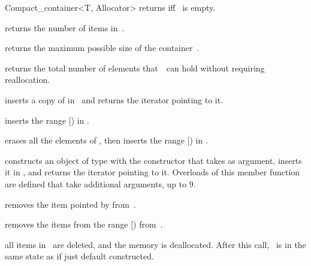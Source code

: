 \begin{ccRefClass}{Compact_container<T, Allocator>}
  {returns  iff \ccVar\ is empty.}

  \ccGlue{}
  {returns the number of items in~\ccVar.}

  \ccGlue{}
  {returns the maximum possible size of the container~\ccVar.}

  \ccGlue{}
  {returns the total number of elements that~\ccVar\ can hold without requiring
   reallocation.}




  {inserts a copy of  in \ccVar\ and returns the iterator pointing
   to it.}

  {inserts the range [) in \ccVar.}

  {erases all the elements of \ccVar, then inserts the range
   [) in \ccVar.}

  {constructs an object of type  with the constructor that takes
    as argument, inserts it in \ccVar, and returns the iterator pointing
   to it.  Overloads of this member function are defined that take additional
   arguments, up to 9.}


  {removes the item pointed by  from~\ccVar.}

  {removes the items from the range [) from~\ccVar.}

  {all items in \ccVar\ are deleted, and the memory is deallocated.
   After this call, \ccVar\ is in the same state as if just default
   constructed.}


\end{ccRefClass}
